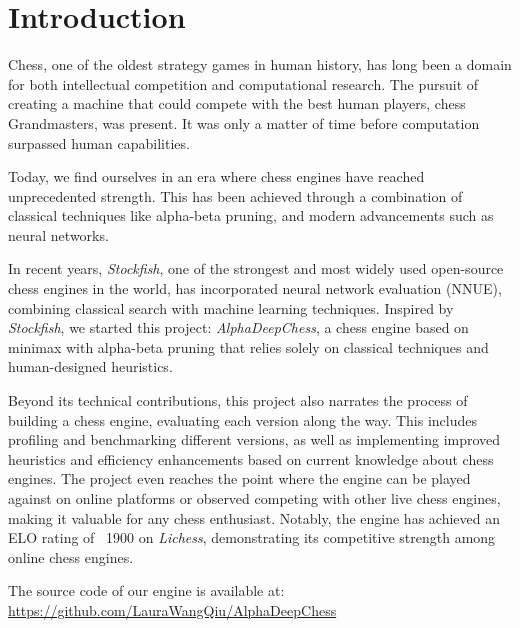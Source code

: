 \chapter{Introduction}\label{cap:introduction}
\renewcommand{\figurename}{Figure}

Chess, one of the oldest strategy games in human history, has long been a domain for both intellectual competition and computational research. The pursuit of creating a machine that could compete with the best human players, chess Grandmasters, was present. It was only a matter of time before computation surpassed human capabilities.

\vspace{1em}

\noindent Today, we find ourselves in an era where chess engines have reached unprecedented strength. This has been achieved through a combination of classical techniques like alpha-beta pruning, and modern advancements such as neural networks.

\vspace{1em}

\noindent In recent years, \textit{Stockfish}, one of the strongest and most widely used open-source chess engines in the world, has incorporated neural network evaluation (NNUE), combining classical search with machine learning techniques. Inspired by \textit{Stockfish}, we started this project: \textit{AlphaDeepChess}, a chess engine based on minimax with alpha-beta pruning that relies solely on classical techniques and human-designed heuristics.

\vspace{1em}

\noindent Beyond its technical contributions, this project also narrates the process of building a chess engine, evaluating each version along the way. This includes profiling and benchmarking different versions, as well as implementing improved heuristics and efficiency enhancements based on current knowledge about chess engines. The project even reaches the point where the engine can be played against on online platforms or observed competing with other live chess engines, making it valuable for any chess enthusiast. Notably, the engine has achieved an ELO rating of ~1900 on \textit{Lichess}, demonstrating its competitive strength among online chess engines.

\vspace{1em}

\noindent The source code of our engine is available at:\\
\url{https://github.com/LauraWangQiu/AlphaDeepChess}

